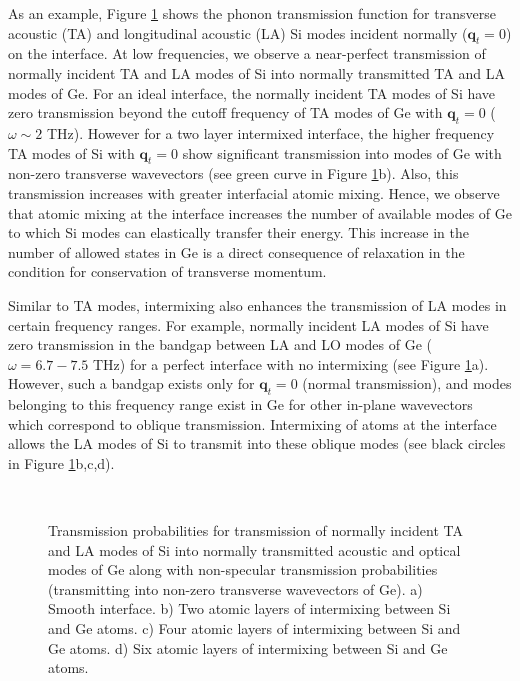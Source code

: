 \documentclass[11pt]{article}
\begin{document}
As an example, Figure \ref{mode_conv} shows the phonon transmission function for transverse acoustic (TA) and longitudinal acoustic (LA) Si modes incident normally ($\boldsymbol{q}_{t}=0$) on the interface. At low frequencies, we observe a near-perfect transmission of normally incident TA and LA modes of Si into normally transmitted TA and LA modes of Ge. For an ideal interface, the normally incident TA modes of Si have zero transmission beyond the cutoff frequency of TA modes of Ge with $\boldsymbol{q}_{t}=0$ ($\omega \sim 2$ THz). However for a two layer intermixed interface, the higher frequency TA modes of Si with $\boldsymbol{q}_{t}=0$ show significant transmission into modes of Ge with non-zero transverse wavevectors (see green curve in Figure \ref{mode_conv}b). Also, this transmission increases with greater interfacial atomic mixing. Hence, we observe that atomic mixing at the interface increases the number of available modes of Ge to which Si modes can elastically transfer their energy. This increase in the number of allowed states in Ge is a direct consequence of relaxation in the condition for conservation of transverse momentum. 

Similar to TA modes, intermixing also enhances the transmission of LA modes in certain frequency ranges. For example, normally incident LA modes of Si have zero transmission in the bandgap between LA and LO modes of Ge ($\omega = 6.7-7.5$ THz) for a perfect interface with no intermixing (see Figure \ref{mode_conv}a). However, such a bandgap exists only for $\boldsymbol{q}_{t}=0$ (normal transmission), and modes belonging to this frequency range exist in Ge for other in-plane wavevectors which correspond to oblique transmission. Intermixing of atoms at the interface allows the LA modes of Si to transmit into these oblique modes (see black circles in Figure \ref{mode_conv}b,c,d). 
\begin{figure}
\centering
{}
\\
\caption{Transmission probabilities for transmission of normally incident TA and LA modes of Si into normally transmitted acoustic and optical modes of Ge along with non-specular transmission probabilities (transmitting into non-zero transverse wavevectors of Ge). a) Smooth interface. b) Two atomic layers of intermixing between Si and Ge atoms. c) Four atomic layers of intermixing between Si and Ge atoms. d) Six atomic layers of intermixing between Si and Ge atoms.}\label{mode_conv}
\end{figure}
\end{document}
